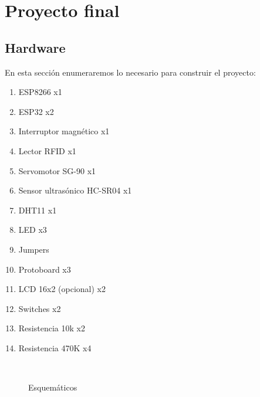 \documentclass[
	12pt, %
	fleqn, %
	a4paper, %
	oneside, %
]{LegrandOrangeBook}
\begin{document}
\chapter{Proyecto final}
\section{Hardware}
En esta sección enumeraremos lo necesario para construir el proyecto:
\begin{enumerate}
\item ESP8266 x1
\item ESP32 x2
\item Interruptor magnético x1
\item Lector RFID x1
\item Servomotor SG-90 x1
\item Sensor ultrasónico HC-SR04 x1
\item DHT11 x1
\item LED x3
\item Jumpers
\item Protoboard x3
\item LCD 16x2 (opcional) x2
\item Switches x2
\item Resistencia 10k x2
\item Resistencia 470K x4
\end{enumerate}
\begin{figure}[H]
\centering
{}
\\
\caption{Esquemáticos}
\end{figure}
\end{document}
